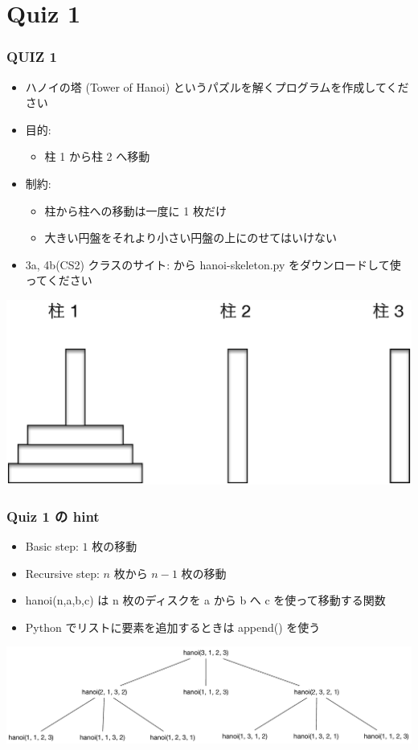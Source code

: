 \section{Quiz 1}
\begin{frame}
\frametitle{QUIZ 1}
  \begin{itemize}
\item ハノイの塔 (Tower of Hanoi) というパズルを解くプログラムを作成してください
\item 目的:
    \begin{itemize}
\item 柱 1 から柱 2 へ移動
    \end{itemize}
\item 制約:
    \begin{itemize}
\item 柱から柱への移動は一度に 1 枚だけ
\item 大きい円盤をそれより小さい円盤の上にのせてはいけない
    \end{itemize}
\item 3a, 4b(CS2) クラスのサイト: \href{https://sites.google.com/presystems.xyz/elementaryCS/}{} 
から hanoi-skeleton.py をダウンロードして使ってください
  \end{itemize}
  \begin{center}
\includegraphics[scale=0.4]{./Figure/elementaryCS-2nd-figHanoi.eps}
  \end{center}
\end{frame}
\begin{frame}
\frametitle{Quiz 1 の hint}
  \begin{itemize}
\item Basic step: $1$ 枚の移動
\item Recursive step: $n$ 枚から \(n-1\) 枚の移動
\item hanoi(n,a,b,c) は n 枚のディスクを a から b へ c を使って移動する関数
\item Python でリストに要素を追加するときは append() を使う
  \end{itemize}
  \begin{center}
\includegraphics[scale=0.28]{./Figure/elementaryCS-figHanoi-Hint.pdf}
  \end{center}
\end{frame}
